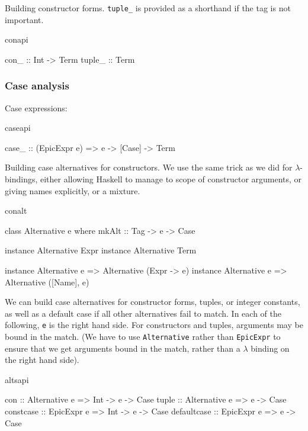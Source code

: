 Building constructor forms. \texttt{tuple\_} is provided as a
shorthand if the tag is not important.

\begin{SaveVerbatim}{conapi}

con_   :: Int -> Term
tuple_ :: Term

\end{SaveVerbatim}

\subsubsection*{Case analysis}

Case expressions:

\begin{SaveVerbatim}{caseapi}

case_ :: (EpicExpr e) => e -> [Case] -> Term

\end{SaveVerbatim}

Building case alternatives for constructors. We use the same trick as
we did for $\lambda$-bindings, either allowing Haskell to manage to
scope of constructor arguments, or giving names explicitly, or a mixture.

\begin{SaveVerbatim}{conalt}

class Alternative e where
    mkAlt :: Tag -> e -> Case

instance Alternative Expr
instance Alternative Term

instance Alternative e => Alternative (Expr -> e)
instance Alternative e => Alternative ([Name], e)

\end{SaveVerbatim}

We can build case alternatives for constructor forms, tuples, or
integer constants, as well as a default case if all other alternatives
fail to match. In each of the following, \texttt{e} is the right hand
side. For constructors and tuples, arguments may be bound in the
match. (We have to use \texttt{Alternative} rather than
\texttt{EpicExpr} to ensure that we get arguments bound in the match,
rather than a $\lambda$ binding on the right hand side).

\begin{SaveVerbatim}{altsapi}

con         :: Alternative e => Int -> e -> Case
tuple       :: Alternative e =>        e -> Case
constcase   :: EpicExpr e    => Int -> e -> Case
defaultcase :: EpicExpr e    =>        e -> Case

\end{SaveVerbatim}

